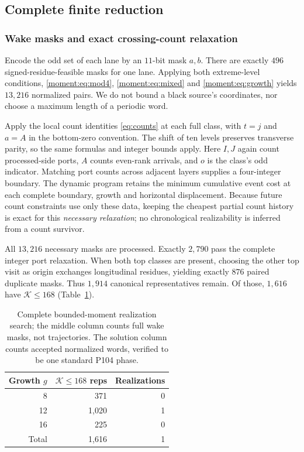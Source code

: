 \subsection{Complete finite reduction}
\subsubsection{Wake masks and exact crossing-count relaxation}
Encode the odd set of each lane by an $11$-bit mask $a,b$.
There are exactly $496$ signed-residue-feasible masks for one lane.
Applying both extreme-level conditions, \eqref{moment:eq:mod4}, \eqref{moment:eq:mixed}
and \eqref{moment:eq:growth} yields $13,216$ normalized pairs. We do not bound a
black source's coordinates, nor choose a maximum length of a periodic word.

Apply the local count identities \eqref{eq:counts} at each full class,
with $t=j$ and $a=A$ in the bottom-zero convention. The shift of ten levels
preserves transverse parity, so the same formulas and integer bounds apply.
Here $I,J$ again count processed-side ports, $A$ counts even-rank arrivals,
and $o$ is the class's odd indicator.
Matching port counts across adjacent layers supplies a four-integer boundary.
The dynamic program retains the minimum cumulative event cost at each complete
boundary, growth and horizontal displacement. Because future count constraints
use only these data, keeping the cheapest partial count history is exact for
this \emph{necessary relaxation}; no chronological realizability is inferred
from a count survivor.

All $13,216$ necessary masks are processed. Exactly $2,790$ pass the complete
integer port relaxation. When both top classes are present, choosing the other
top visit as origin exchanges longitudinal residues, yielding exactly $876$
paired duplicate masks. Thus $1,914$ canonical representatives remain.
Of those, $1,616$ have $\mathcal K\le168$ (Table~\ref{moment:tab:counts}).

\begin{table}[t]
\centering
\begin{tabular}{rrr}
\toprule
Growth $g$ & $\mathcal K\le168$ reps & Realizations \\
\midrule
8 & 371 & 0\\
12 & 1,020 & 1\\
16 & 225 & 0\\
\midrule
Total & 1,616 & 1\\
\bottomrule
\end{tabular}
\caption{Complete bounded-moment realization search; the middle column counts
full wake masks, not trajectories. The solution column counts accepted
normalized words, verified to be one standard P104 phase.}
\label{moment:tab:counts}
\end{table}

